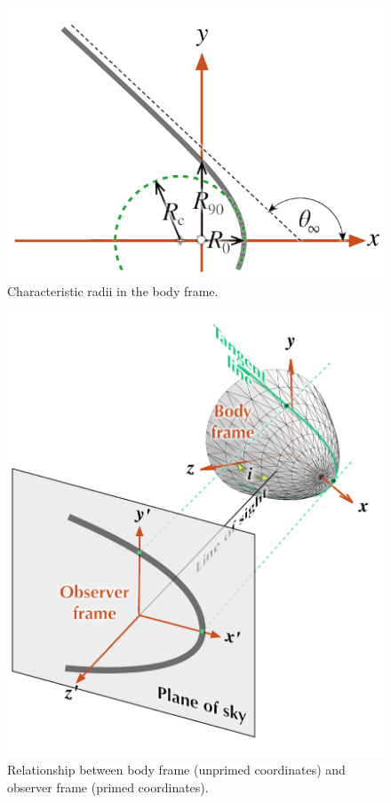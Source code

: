 \begin{figure}
  \centering
  \includegraphics[width=\linewidth]{figs/characteristic-radii}
  \caption{Characteristic radii in the body frame.}
  \label{fig:characteristic-radii}
\end{figure}


\begin{figure}
  \centering
  \includegraphics[width=\linewidth]{figs/projection-pos}
  \caption{Relationship between body frame (unprimed coordinates) and
    observer frame (primed coordinates).}
  \label{fig:projection-pos}
\end{figure}




